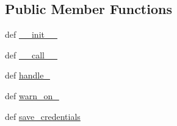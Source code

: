\subsection*{Public Member Functions}
\begin{DoxyCompactItemize}
\item 
def \hyperlink{classpip_1_1__internal_1_1network_1_1auth_1_1MultiDomainBasicAuth_ab4dc0ca7c971f3933fae30a233da879f}{\+\_\+\+\_\+init\+\_\+\+\_\+}
\item 
def \hyperlink{classpip_1_1__internal_1_1network_1_1auth_1_1MultiDomainBasicAuth_ab45fd59d0ef650935b9c626b326eccc8}{\+\_\+\+\_\+call\+\_\+\+\_\+}
\item 
def \hyperlink{classpip_1_1__internal_1_1network_1_1auth_1_1MultiDomainBasicAuth_a1ba9114f6f4de163fc9e6a7e48c4a39c}{handle\+\_}
\item 
def \hyperlink{classpip_1_1__internal_1_1network_1_1auth_1_1MultiDomainBasicAuth_adcb2685d767ad98ef1fe5401336a6718}{warn\+\_\+on\+\_}
\item 
def \hyperlink{classpip_1_1__internal_1_1network_1_1auth_1_1MultiDomainBasicAuth_a53bf2628a43bb7a107ca19a05a8d6147}{save\+\_\+credentials}
\end{DoxyCompactItemize}
